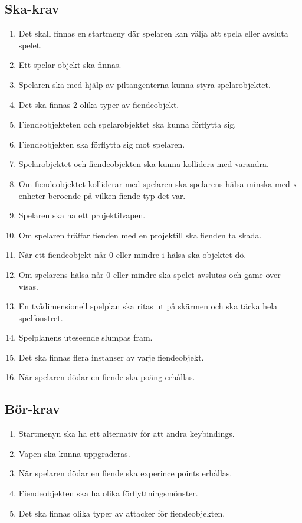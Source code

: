 \documentclass{TDP005mall}
\begin{document}
\subsection{Ska-krav}
\begin{enumerate}[label=S\arabic*]
\item Det skall finnas en startmeny där spelaren kan välja att spela eller avsluta spelet.
\item Ett spelar objekt ska finnas.
\item Spelaren ska med hjälp av piltangenterna kunna styra spelarobjektet.
\item Det ska finnas 2 olika typer av fiendeobjekt.
\item Fiendeobjekteten och spelarobjektet ska kunna förflytta sig.
\item Fiendeobjekten ska förflytta sig mot spelaren.
\item Spelarobjektet och fiendeobjekten ska kunna kollidera med varandra.
\item Om fiendeobjektet kolliderar med spelaren ska spelarens hälsa minska med x enheter beroende på vilken fiende typ det var.
\item Spelaren ska ha ett projektilvapen.
\item Om spelaren träffar fienden med en projektill ska fienden ta skada.
\item När ett fiendeobjekt når 0 eller mindre i hälsa ska objektet dö.
\item Om spelarens hälsa når 0 eller mindre ska spelet avslutas och game over visas.
\item En tvådimensionell spelplan ska ritas ut på skärmen och ska täcka hela spelfönstret.
\item Spelplanens uteseende slumpas fram.
\item Det ska finnas flera instanser av varje fiendeobjekt.
\item När spelaren dödar en fiende ska poäng erhållas.
\end{enumerate}

\subsection{Bör-krav}
\begin{enumerate}[label=B\arabic*]
\item Startmenyn ska ha ett alternativ för att ändra keybindings.
\item Vapen ska kunna uppgraderas.
\item När spelaren dödar en fiende ska experince points erhållas.
\item Fiendeobjekten ska ha olika förflyttningsmönster.
\item Det ska finnas olika typer av attacker för fiendeobjekten.
\end{enumerate}
\end{document}
